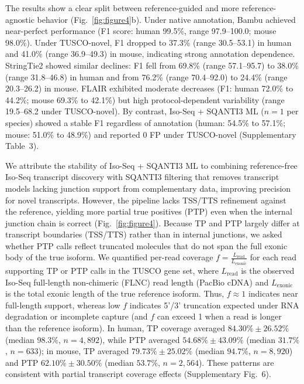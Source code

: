 \documentclass[pdflatex,sn-nature]{sn-jnl}%
\newcommand{\tuscoGeneSet}{TUSCO gene set}
\newcommand{\tuscoNovel}{TUSCO-novel}
\begin{document}
The results show a clear split between reference-guided and more reference-agnostic behavior (Fig.~\ref{fig:figure4}b). Under native annotation, Bambu achieved near-perfect performance (F1 score: human 99.5\%, range 97.9--100.0; mouse 98.0\%). Under \tuscoNovel{}, F1 dropped to 37.3\% (range 30.5--53.1) in human and 41.0\% (range 36.9--49.3) in mouse, indicating strong annotation dependence. StringTie2 showed similar declines: F1 fell from 69.8\% (range 57.1--95.7) to 38.0\% (range 31.8--46.8) in human and from 76.2\% (range 70.4--92.0) to 24.4\% (range 20.3--26.2) in mouse. FLAIR exhibited moderate decreases (F1: human 72.0\% to 44.2\%; mouse 69.3\% to 42.1\%) but high protocol-dependent variability (range 19.5--68.2 under \tuscoNovel{}). By contrast, Iso-Seq + SQANTI3 ML ($n=1$ per species) showed a stable F1 regardless of annotation (human: 54.5\% to 57.1\%; mouse: 51.0\% to 48.9\%) and reported 0 FP under \tuscoNovel{} (Supplementary Table~3).

We attribute the stability of Iso-Seq + SQANTI3 ML to combining reference-free Iso-Seq transcript discovery with SQANTI3 filtering that removes transcript models lacking junction support from complementary data, improving precision for novel transcripts. However, the pipeline lacks TSS/TTS refinement against the reference, yielding more partial true positives (PTP) even when the internal junction chain is correct (Fig.~\ref{fig:figure4}). Because TP and PTP largely differ at transcript boundaries (TSS/TTS) rather than in internal junctions, we asked whether PTP calls reflect truncated molecules that do not span the full exonic body of the true isoform. We quantified per-read coverage $f = \frac{L_{\mathrm{read}}}{L_{\mathrm{exonic}}}$ for each read supporting TP or PTP calls in the \tuscoGeneSet{}, where $L_{\mathrm{read}}$ is the observed Iso-Seq full-length non-chimeric (FLNC) read length (PacBio cDNA) and $L_{\mathrm{exonic}}$ is the total exonic length of the true reference isoform. Thus, $f \approx 1$ indicates near full-length support, whereas low $f$ indicates 5'/3' truncation expected under RNA degradation or incomplete capture (and $f$ can exceed 1 when a read is longer than the reference isoform). In human, TP coverage averaged $84.30\% \pm 26.52\%$ (median $98.3\%$, $n = 4,892$), while PTP averaged $54.68\% \pm 43.09\%$ (median $31.7\%$, $n = 633$); in mouse, TP averaged $79.73\% \pm 25.02\%$ (median $94.7\%$, $n = 8,920$) and PTP $62.10\% \pm 30.50\%$ (median $53.7\%$, $n = 2,564$). These patterns are consistent with partial transcript coverage effects (Supplementary Fig.~6).
\end{document}
